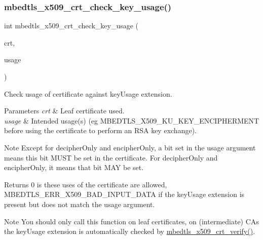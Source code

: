 \subsubsection{\texorpdfstring{mbedtls\+\_\+x509\+\_\+crt\+\_\+check\+\_\+key\+\_\+usage()}{mbedtls\_x509\_crt\_check\_key\_usage()}}
{\footnotesize\ttfamily int mbedtls\+\_\+x509\+\_\+crt\+\_\+check\+\_\+key\+\_\+usage (\begin{DoxyParamCaption}\item[{const \mbox{\hyperlink{structmbedtls__x509__crt}{mbedtls\+\_\+x509\+\_\+crt}} $\ast$}]{crt,  }\item[{unsigned int}]{usage }\end{DoxyParamCaption})}



Check usage of certificate against key\+Usage extension. 


\begin{DoxyParams}{Parameters}
{\em crt} & Leaf certificate used. \\
\hline
{\em usage} & Intended usage(s) (eg M\+B\+E\+D\+T\+L\+S\+\_\+\+X509\+\_\+\+K\+U\+\_\+\+K\+E\+Y\+\_\+\+E\+N\+C\+I\+P\+H\+E\+R\+M\+E\+NT before using the certificate to perform an R\+SA key exchange).\\
\hline
\end{DoxyParams}
\begin{DoxyNote}{Note}
Except for decipher\+Only and encipher\+Only, a bit set in the usage argument means this bit M\+U\+ST be set in the certificate. For decipher\+Only and encipher\+Only, it means that bit M\+AY be set.
\end{DoxyNote}
\begin{DoxyReturn}{Returns}
0 is these uses of the certificate are allowed, M\+B\+E\+D\+T\+L\+S\+\_\+\+E\+R\+R\+\_\+\+X509\+\_\+\+B\+A\+D\+\_\+\+I\+N\+P\+U\+T\+\_\+\+D\+A\+TA if the key\+Usage extension is present but does not match the usage argument.
\end{DoxyReturn}
\begin{DoxyNote}{Note}
You should only call this function on leaf certificates, on (intermediate) C\+As the key\+Usage extension is automatically checked by {\ttfamily \mbox{\hyperlink{group__x509__module_ga98ed4504e4f832b735a230acf54fcde3}{mbedtls\+\_\+x509\+\_\+crt\+\_\+verify()}}}. 
\end{DoxyNote}
\mbox{\label{group__x509__module_gab33c1e4e20bea7ce536119f54a113c6b}} 
